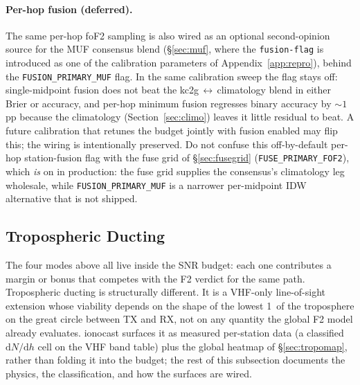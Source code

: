 \documentclass[11pt,a4paper]{article}
\newcommand{\SI}[2]{#1\,\text{#2}}
\newcommand{\km}{\text{km}}
\begin{document}
\paragraph{Per-hop fusion (deferred).}  The same per-hop foF2
sampling is also wired as an optional second-opinion source for
the MUF consensus blend (\S\ref{sec:muf}, where the
\texttt{fusion-flag} is introduced as one of the calibration
parameters of Appendix~\ref{app:repro}), behind the
\texttt{FUSION\_PRIMARY\_MUF} flag.  In the same calibration sweep
the flag stays off: single-midpoint fusion does not beat the
kc2g\,$\leftrightarrow$\,climatology blend in either Brier or
accuracy, and per-hop minimum fusion regresses binary accuracy by
${\sim}1$\,pp because the climatology
(Section~\ref{sec:climo}) leaves it little residual to
beat.  A future calibration that retunes the budget jointly with
fusion enabled may flip this; the wiring is intentionally
preserved.  Do not confuse this off-by-default per-hop
station-fusion flag with the fuse grid of \S\ref{sec:fusegrid}
(\texttt{FUSE\_PRIMARY\_FOF2}), which \emph{is} on in production:
the fuse grid supplies the consensus's climatology leg wholesale,
while \texttt{FUSION\_PRIMARY\_MUF} is a narrower per-midpoint
IDW alternative that is not shipped.

\subsection{Tropospheric Ducting}\label{sec:tropo}

The four modes above all live inside the SNR budget: each one
contributes a margin or bonus that competes with the F2 verdict for
the same path.  Tropospheric ducting is structurally different. It
is a VHF-only line-of-sight extension whose viability depends on the
shape of the lowest \SI{1}{\km} of the troposphere on the great
circle between TX and RX, not on any quantity the global F2 model
already evaluates. ionocast surfaces it as measured per-station
data (a classified $\mathrm{d}N/\mathrm{d}h$ cell on the VHF band
table) plus the global heatmap of \S\ref{sec:tropomap}, rather
than folding it into the
budget; the rest of this subsection documents the physics, the
classification, and how the surfaces are wired.
\end{document}
